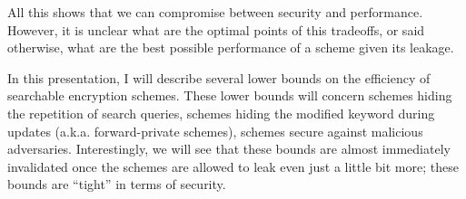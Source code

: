 All this shows that we can compromise between security and performance. 
However, it is unclear what are the optimal points of this tradeoffs, or said otherwise, what are the best possible performance of a scheme given its leakage.

\medskip

In this presentation, I will describe several lower bounds on the efficiency of searchable encryption schemes.
These lower bounds will concern schemes hiding the repetition of search queries, schemes hiding the modified keyword during updates (a.k.a. forward-private schemes), schemes secure against malicious adversaries.
Interestingly, we will see that these bounds are almost immediately invalidated once the schemes are allowed to leak even just a little bit more; these bounds are ``tight'' in terms of security. 





